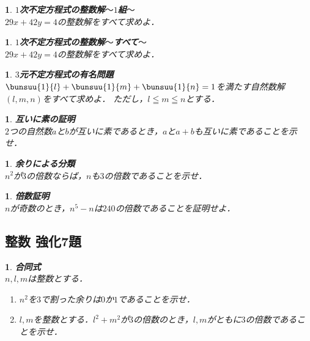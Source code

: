 \documentclass[10pt,
fleqn,
dvipdfmx,
uplatex
]{jsarticle}
\newtheorem{question}[Question]{}
\begin{document}
\begin{question}{\bf\boldmath $1$次不定方程式の整数解$〜1$組$〜$}\\
${29}x+{42}y=4$の整数解をすべて求めよ．
\end{question}



\begin{question}{\bf\boldmath $1$次不定方程式の整数解$〜$すべて$〜$}\\
${29}x+{42}y=4$の整数解をすべて求めよ．
\end{question}



\begin{question}{\bf\boldmath $3$元不定方程式の有名問題}\\
$\bunsuu{1}{l}+\bunsuu{1}{m}+\bunsuu{1}{n}=1$を満たす自然数解$\left(l,m,n\right)$をすべて求めよ．
ただし，$l\leqq m\leqq n$とする．
\end{question}



\begin{question}{\bf\boldmath 互いに素の証明}\\
$2$つの自然数$a$と$b$が互いに素であるとき，$a$と$a+b$も互いに素であることを示せ．
\end{question}



\begin{question}{\bf\boldmath 余りによる分類}\\
$n^2$が$3$の倍数ならば，$n$も$3$の倍数であることを示せ．
\end{question}



\begin{question}{\bf\boldmath 倍数証明}\\
$n$が奇数のとき，$n^5-n$は${240}$の倍数であることを証明せよ．
\end{question}

\subsection{整数 強化7題}



\begin{question}{\bf\boldmath 合同式}\\
$n, l, m$は整数とする．
\begin{enumerate}
\item $n^2$を$3$で割った余りは$0$か$1$であることを示せ．
\item $l, m$を整数とする．$l^2+m^2$が$3$の倍数のとき，$l, m$がともに$3$の倍数であることを示せ．
\end{enumerate}

\end{question}
\end{document}
